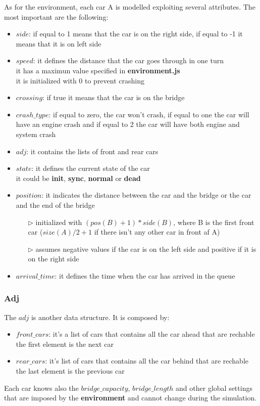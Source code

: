 As for the environment, each car A is modelled exploiting several attributes. The most important
are the following:
\begin{itemize}
    \item $side$: if equal to 1 means that the car is on the right side, 
    if equal to -1 it means that it is on left side
    \item $speed$: it defines the distance that the car goes through in one turn\\
    it has a maximun value specified in \textbf{environment.js}\\
    it is initialized with 0 to prevent crashing 
    \item $crossing$: if true it means that the car is on the bridge
    \item $crash\_type$: if equal to zero, the car won't crash, if equal to one the car will have an engine crash
    and if equal to 2 the car will have both engine and system crash 
    \item $adj$: it contains the lists of front and rear cars
    \item $state$: it defines the current state of the car\\ it could be \textbf{init}, \textbf{sync}, \textbf{normal} or \textbf{dead}
    \item $position$: it indicates the distance between the car and the bridge or the car and the end of the
    bridge
    \begin{itemize}
        \item[$\rhd$] initialized with $( pos(B) + 1 ) * side(B)$, where B is the first front 
                      car ($size(A) / 2 + 1$ if there isn't any other car in front af A)
        \item[$\rhd$] assumes negative values if the car is on the left side and positive if it is on the right side
    \end{itemize}
    \item $arrival\_time$: it defines the time when the car has arrived in the queue
\end{itemize}

\subsubsection{Adj}
The $adj$ is another data structure. It is composed by:
\begin{itemize}
    \item $front\_cars$: it's a list of cars that contains all the car ahead that are rechable\\ the first element
     is the next car
    \item $rear\_cars$: it's list of cars that contains all the car behind that are rechable\\ the last element
     is the previous car
\end{itemize} 

\noindent
Each car knows also the $bridge\_capacity$, $bridge\_length$ and other global settings 
that are imposed by the \textbf{environment} and cannot change during the simulation.
